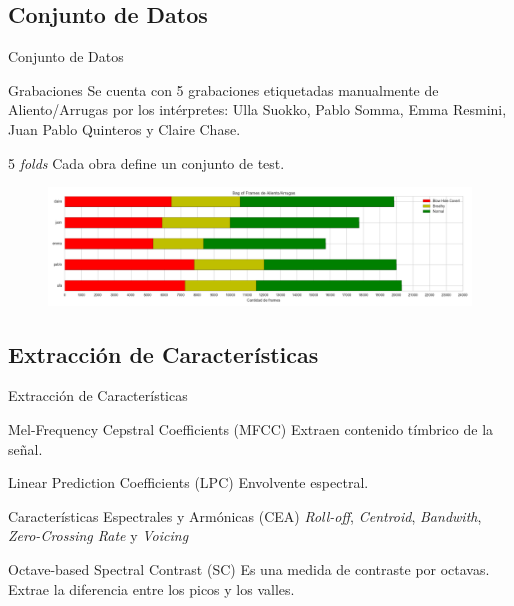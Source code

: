 \documentclass[aspectratio=169]{beamer}
\begin{document}
\subsection{Conjunto de Datos}

\begin{frame}{Conjunto de Datos}
\begin{block}{Grabaciones}
Se cuenta con 5 grabaciones etiquetadas manualmente de Aliento/Arrugas por los intérpretes: Ulla Suokko, Pablo Somma, Emma Resmini, Juan Pablo Quinteros y Claire Chase.
\end{block}
\begin{block}{5 \textit{folds}}
Cada obra define un conjunto de test. 
\end{block}

\begin{figure}[H]
\begin{center}
\includegraphics[width=1\textwidth]{dataset}
\end{center}
\end{figure}
\end{frame}

\subsection{Extracción de Características}

\begin{frame}{Extracción de Características}
\begin{block}{Mel-Frequency Cepstral Coefficients (MFCC)}
Extraen contenido tímbrico de la señal.
\end{block}
\begin{block}{Linear Prediction Coefficients (LPC)}
Envolvente espectral.
\end{block}
\begin{block}{Características Espectrales y Armónicas (CEA)}
\textit{Roll-off}, \textit{Centroid}, \textit{Bandwith}, \textit{Zero-Crossing Rate} y \textit{Voicing} 
\end{block}
\begin{block}{Octave-based Spectral Contrast (SC)}
Es una medida de contraste por octavas. Extrae la diferencia entre los picos y los valles.
\end{block}
\end{frame}
\end{document}
